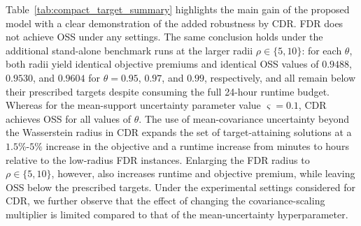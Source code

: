 \documentclass[opre,sglanonrev]{informs4}
\begin{document}
Table~\ref{tab:compact_target_summary} highlights the main gain of the proposed model with a clear demonstration of the added robustness by CDR. FDR does not achieve OSS under any settings. The same conclusion holds under the additional stand-alone benchmark runs at the larger radii $\rho \in \{5,10\}$: for each $\theta$, both radii yield identical objective premiums and identical OSS values of $0.9488$, $0.9530$, and $0.9604$ for $\theta=0.95$, $0.97$, and $0.99$, respectively, and all remain below their prescribed targets despite consuming the full 24-hour runtime budget. Whereas for the mean-support uncertainty parameter value $\varsigma = 0.1$, CDR achieves OSS for all values of $\theta$. The use of mean-covariance uncertainty beyond the Wasserstein radius in CDR expands the set of target-attaining solutions at a $1.5\%$-$5\%$ increase in the objective and a runtime increase from minutes to hours relative to the low-radius FDR instances. Enlarging the FDR radius to $\rho \in \{5,10\}$, however, also increases runtime and objective premium, while leaving OSS below the prescribed targets. Under the experimental settings considered for CDR, we further observe that the effect of changing the covariance-scaling multiplier is limited compared to that of the mean-uncertainty hyperparameter.
\end{document}
